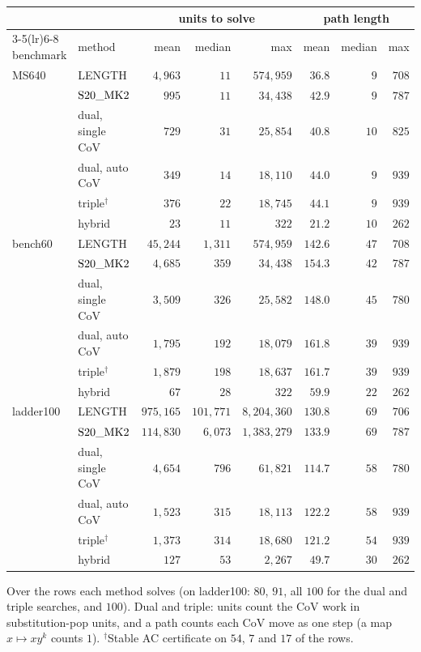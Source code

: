 \begin{center}
\small
\begin{tabular}{llrrrrrr}
\toprule
& & \multicolumn{3}{c}{units to solve} & \multicolumn{3}{c}{path length}\\
\cmidrule(lr){3-5}\cmidrule(lr){6-8}
benchmark & method & mean & median & max & mean & median & max\\
\midrule
MS640 & LENGTH & $4{,}963$ & $11$ & $574{,}959$ & $36.8$ & $9$ & $708$\\
 & $\mathrm{S20\_MK2}$ & $995$ & $11$ & $34{,}438$ & $42.9$ & $9$ & $787$\\
 & dual, single CoV & $729$ & $31$ & $25{,}854$ & $40.8$ & $10$ & $825$\\
 & dual, auto CoV & $349$ & $14$ & $18{,}110$ & $44.0$ & $9$ & $939$\\
 & triple$^{\dagger}$ & $376$ & $22$ & $18{,}745$ & $44.1$ & $9$ & $939$\\
 & hybrid & $23$ & $11$ & $322$ & $21.2$ & $10$ & $262$\\
\midrule
bench60 & LENGTH & $45{,}244$ & $1{,}311$ & $574{,}959$ & $142.6$ & $47$ & $708$\\
 & $\mathrm{S20\_MK2}$ & $4{,}685$ & $359$ & $34{,}438$ & $154.3$ & $42$ & $787$\\
 & dual, single CoV & $3{,}509$ & $326$ & $25{,}582$ & $148.0$ & $45$ & $780$\\
 & dual, auto CoV & $1{,}795$ & $192$ & $18{,}079$ & $161.8$ & $39$ & $939$\\
 & triple$^{\dagger}$ & $1{,}879$ & $198$ & $18{,}637$ & $161.7$ & $39$ & $939$\\
 & hybrid & $67$ & $28$ & $322$ & $59.9$ & $22$ & $262$\\
\midrule
ladder100 & LENGTH & $975{,}165$ & $101{,}771$ & $8{,}204{,}360$ & $130.8$ & $69$ & $706$\\
 & $\mathrm{S20\_MK2}$ & $114{,}830$ & $6{,}073$ & $1{,}383{,}279$ & $133.9$ & $69$ & $787$\\
 & dual, single CoV & $4{,}654$ & $796$ & $61{,}821$ & $114.7$ & $58$ & $780$\\
 & dual, auto CoV & $1{,}523$ & $315$ & $18{,}113$ & $122.2$ & $58$ & $939$\\
 & triple$^{\dagger}$ & $1{,}373$ & $314$ & $18{,}680$ & $121.2$ & $54$ & $939$\\
 & hybrid & $127$ & $53$ & $2{,}267$ & $49.7$ & $30$ & $262$\\
\bottomrule
\end{tabular}

\smallskip
\footnotesize Over the rows each method solves (on ladder100: $80$, $91$, all $100$ for the dual and triple
searches, and $100$). Dual and triple: units count the CoV work in substitution-pop units, and a path counts each CoV
move as one step (a map $x\mapsto xy^k$ counts $1$). $^{\dagger}$Stable AC certificate on $54$, $7$ and $17$ of the
rows.
\end{center}


